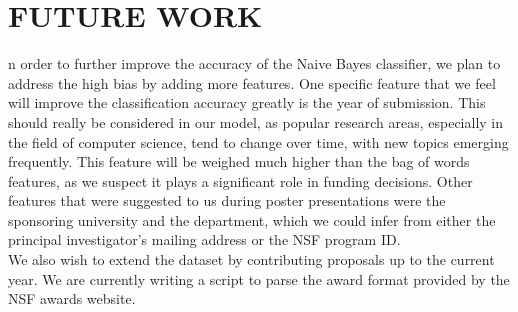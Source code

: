\documentclass{article}
\begin{document}
\section{FUTURE WORK}
n order to further improve the accuracy of the Naive Bayes classifier, we plan to address the high bias by adding more features.  One specific feature that we feel will improve the classification accuracy greatly is the year of submission.  This should really be considered in our model, as popular research areas, especially in the field of computer science, tend to change over time, with new topics emerging frequently.  This feature will be weighed much higher than the bag of words features, as we suspect it plays a significant role in funding decisions.  Other features that were suggested to us during poster presentations were the sponsoring university and the department, which we could infer from either the principal investigator’s mailing address or the NSF program ID.\\

We also wish to extend the dataset by contributing proposals up to the current year.  We are currently writing a script to parse the award format provided by the NSF awards website.\\
\end{document}
